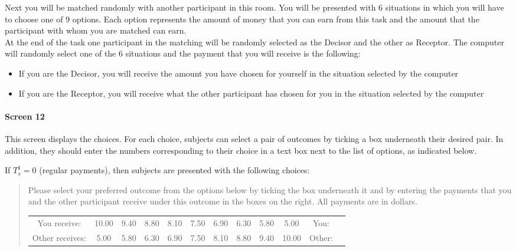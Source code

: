 \documentclass[11pt]{article}
\begin{document}
\begin{tcolorbox}
Next you will be matched randomly with another participant in this room. You will be presented with 6 situations in which you will have to choose one of 9 options. Each option represents the amount of money that you can earn from this task and the amount that the participant with whom you are matched can earn.\\

At the end of the task one participant in the matching will be randomly selected as the Decisor and the other as Receptor. The computer will randomly select one of the 6 situations and the payment that you will receive is the following:
\begin{itemize}
	\item If you are the Decisor, you will receive the amount you have chosen for yourself in the situation selected by the computer
	\item If you are the Receptor, you will receive what the other participant has chosen for you in the situation selected by the computer
\end{itemize}
\end{tcolorbox}

\paragraph{Screen 12} This screen displays the choices. For each choice, subjects can select a pair of outcomes by ticking a box underneath their desired pair. In addition, they should enter the numbers corresponding to their choice in a text box next to the list of options, as indicated below.

If $T_s^1=0$ (regular payments), then subjects are presented with the following choices: 
\begin{tcolorbox}
\begin{quote}
\begin{center}
Please select your preferred outcome from the options below by ticking the box underneath it and by entering the payments that you and the other participant receive under this outcome in the boxes on the right. All payments are in dollars.\\

\begin{tabular}{c|c|c|c|c|c|c|c|c|c|c|c|}
\cline{2-12} You receive: & 10.00&	9.40	&8.80	&8.10	&7.50	&6.90&	6.30&	5.80	&5.00 & You:& \\ 
Other receives: &5.00	&5.80 &	6.30 &	6.90	&7.50 &	8.10&	8.80	&9.40	&10.00 &Other: & \\ \cline{2-12}
\end{tabular}
\end{center}
\end{quote}
\end{tcolorbox}
\end{document}
